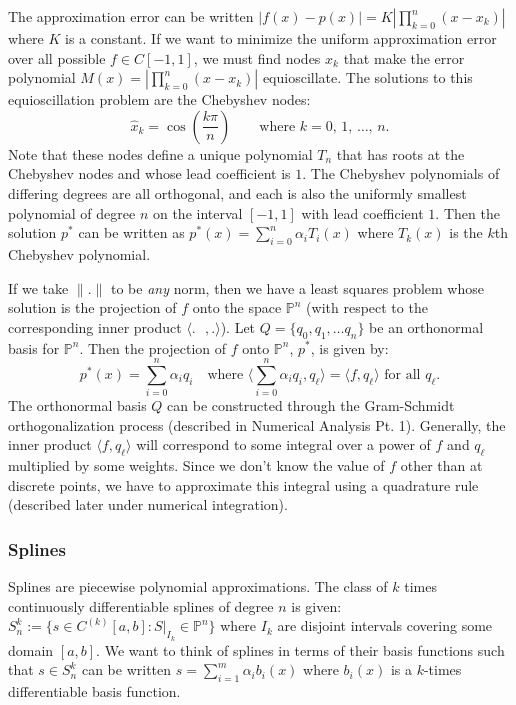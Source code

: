 \documentclass[12pt]{article}
\begin{document}
The approximation error can be written $|f(x) - p(x)| = K|\prod_{k=0}^n(x-x_k)|$ where
$K$ is a constant.
If we want to minimize the uniform approximation error over all possible $f \in C[-1,1]$,
we must find nodes $x_k$ that make the error polynomial 
$M(x) = |\prod_{k=0}^n (x-x_k)|$ equioscillate.
The solutions to this equioscillation problem are the Chebyshev nodes:
$$
\hat{x}_k = \cos \left(\frac{k\pi}{n}\right) \qquad \text{where $k = 0$, $1$, $\ldots$, $n$.}
$$
Note that these nodes define a unique polynomial $T_n$ that has roots at the Chebyshev
nodes and whose lead coefficient is $1$.
The Chebyshev polynomials of differing degrees are all orthogonal, and each is also 
the uniformly smallest polynomial of degree $n$ on the interval $[-1,1]$ with lead
coefficient $1$.
Then the solution $p^*$ can be written as
$p^*(x) = \sum_{i=0}^n \alpha_i T_i(x)$ where $T_k(x)$ is
the $k$th Chebyshev polynomial.

If we take $\|.\|$ to be {\it any} norm, then we have a least squares problem whose
solution is the projection of $f$ onto the space $\mathbb{P}^n$ (with respect to
the corresponding inner product $\langle .\text{ },.\rangle$).
Let $Q = \{ q_0, q_1, \ldots q_n \}$ be an orthonormal basis for $\mathbb{P}^n$.
Then the projection of $f$ onto $\mathbb{P}^n$, $p^*$, is given by:
$$
p^*(x) = \sum_{i=0}^n \alpha_i q_i \quad \text{where } 
\langle \sum_{i=0}^n \alpha_iq_i, q_\ell\rangle 
= \langle f, q_\ell\rangle \text{ for all $q_\ell$}.
$$
The orthonormal basis $Q$ can be constructed through the Gram-Schmidt orthogonalization
process (described in Numerical Analysis Pt. 1).
Generally, the inner product $\langle f, q_\ell\rangle$ will correspond to some
integral over a power of $f$ and $q_\ell$ multiplied by some weights.
Since we don't know the value of $f$ other than at discrete points, we have to approximate
this integral using a quadrature rule (described later under numerical integration).

\subsubsection*{Splines}

Splines are piecewise polynomial approximations.
The class of $k$ times continuously differentiable splines
of degree $n$ is given:
$S^k_n := \{s \in C^{(k)}[a,b] : S|_{I_k} \in \mathbb{P}^n\}$ where $I_k$
are disjoint intervals covering some domain $[a,b]$.
We want to think of splines in terms of their basis functions
such that $s \in S^k_n$ can be written
$s = \sum_{i=1}^m \alpha_i b_i(x)$ where $b_i(x)$ is a
$k$-times differentiable basis function.
\end{document}
